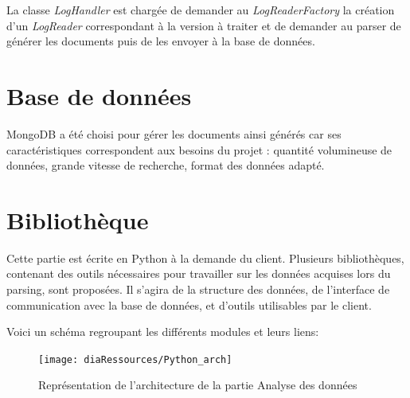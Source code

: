 La classe \textit{LogHandler} est chargée de demander au \textit{LogReaderFactory} la création d'un \textit{LogReader} correspondant à la version à traiter et de demander au parser de générer les documents puis de les envoyer à la base de données. 
 
\section{Base de données}
MongoDB a été choisi pour gérer les documents ainsi générés car ses caractéristiques correspondent aux besoins du projet : quantité volumineuse de données, grande vitesse de recherche, format des données adapté. 

\section{Bibliothèque}
Cette partie est écrite en Python à la demande du client. Plusieurs bibliothèques, contenant des outils nécessaires pour travailler sur les données acquises lors du parsing, sont proposées. Il s'agira de la structure des données, de l'interface de communication avec la base de données, et d'outils utilisables par le client.

Voici un schéma regroupant les différents modules et leurs liens:
\begin{figure}[!h]
  \begin{center}
    \texttt{[image: diaRessources/Python\_arch]}\\
  \end{center}
  \caption{Représentation de l'architecture de la partie Analyse des données}
\end{figure}

